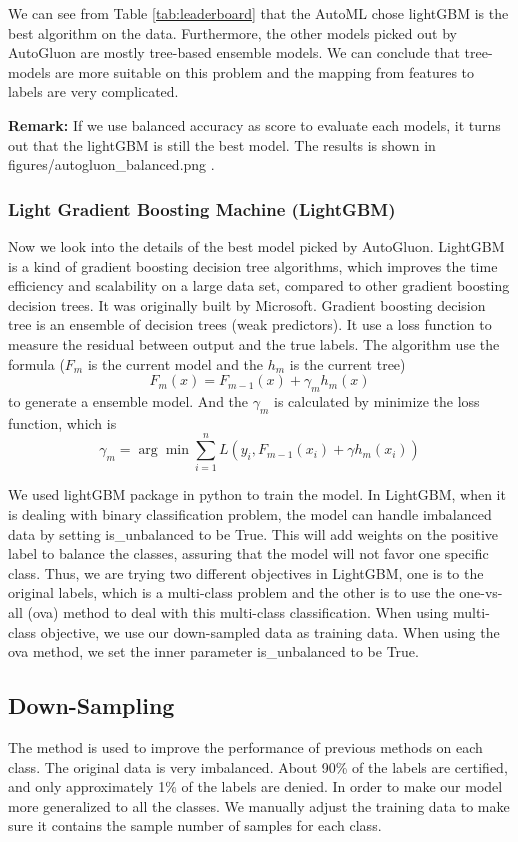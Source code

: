 \documentclass{article}
\begin{document}
We can see from Table \ref{tab:leaderboard} that the AutoML chose lightGBM is the best algorithm on the data. Furthermore, the other models picked out by AutoGluon are mostly tree-based ensemble models. We can conclude that tree-models are more suitable on this problem and the mapping from features to labels are very complicated. 

\textbf{Remark:} If we use balanced accuracy as score to evaluate each models, it turns out that the lightGBM is still the best model. The results is shown in figures/autogluon\_balanced.png . 

\subsubsection{Light Gradient Boosting Machine (LightGBM) \cite{NIPS2017_6449f44a}}
Now we look into the details of the best model picked by AutoGluon. LightGBM is a kind of gradient boosting decision tree algorithms, which improves the time efficiency and scalability on a large data set, compared to other gradient boosting decision trees. It was originally built by Microsoft. Gradient boosting decision tree is an ensemble of decision trees (weak predictors). It use a loss function to measure the residual between output and the true labels. The algorithm use the formula ($F_m$ is the current model and the $h_m$ is the current tree)
$$
F_m(x) = F_{m-1}(x) + \gamma_mh_m(x) 
$$
to generate a ensemble model. And the $\gamma_m$ is calculated by minimize the loss function, which is 
$$
\gamma_m = \arg\min \sum_{i = 1}^n L(y_i, F_{m-1}(x_i) + \gamma h_m(x_i))
$$

We used lightGBM package in python to train the model. In LightGBM, when it is dealing with binary classification problem, the model can handle imbalanced data by setting is\_unbalanced to be True. This will add weights on the positive label to balance the classes, assuring that the model will not favor one specific class. Thus, we are trying two different objectives in LightGBM, one is to the original labels, which is a multi-class problem and the other is to use the one-vs-all (ova) method to deal with this multi-class classification. When using multi-class objective, we use our down-sampled data as training data. When using the ova method, we set the inner parameter is\_unbalanced to be True. 

\subsection{Down-Sampling} \label{down-sampling}
The method is used to improve the performance of previous methods on each class. The original data is very imbalanced. About 90\% of the labels are certified, and only approximately 1\% of the labels are denied. In order to make our model more generalized to all the classes. We manually adjust the training data to make sure it contains the sample number of samples for each class. 
\end{document}

